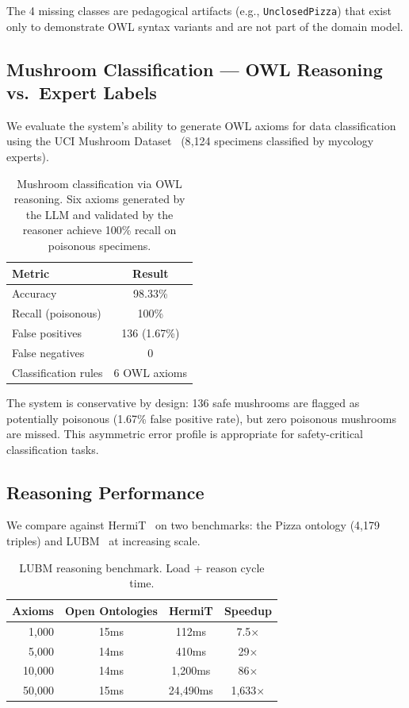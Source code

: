 \documentclass[runningheads]{llncs}
\begin{document}
The 4 missing classes are pedagogical artifacts (e.g., \texttt{UnclosedPizza}) that exist only to demonstrate OWL syntax variants and are not part of the domain model.

\subsection{Mushroom Classification — OWL Reasoning vs.\ Expert Labels}

We evaluate the system's ability to generate OWL axioms for data classification using the UCI Mushroom Dataset~\cite{mushroom} (8{,}124 specimens classified by mycology experts).

\begin{table}[t]
\centering
\caption{Mushroom classification via OWL reasoning. Six axioms generated by the LLM and validated by the reasoner achieve 100\% recall on poisonous specimens.}
\label{tab:mushroom}
\begin{tabular}{@{}lc@{}}
\toprule
\textbf{Metric} & \textbf{Result} \\
\midrule
Accuracy & 98.33\% \\
Recall (poisonous) & 100\% \\
False positives & 136 (1.67\%) \\
False negatives & 0 \\
Classification rules & 6 OWL axioms \\
\bottomrule
\end{tabular}
\end{table}

The system is conservative by design: 136 safe mushrooms are flagged as potentially poisonous (1.67\% false positive rate), but zero poisonous mushrooms are missed. This asymmetric error profile is appropriate for safety-critical classification tasks.

\subsection{Reasoning Performance}

We compare against HermiT~\cite{hermit} on two benchmarks: the Pizza ontology (4{,}179 triples) and LUBM~\cite{lubm} at increasing scale.

\begin{table}[t]
\centering
\caption{LUBM reasoning benchmark. Load + reason cycle time.}
\label{tab:lubm}
\begin{tabular}{@{}rccc@{}}
\toprule
\textbf{Axioms} & \textbf{Open Ontologies} & \textbf{HermiT} & \textbf{Speedup} \\
\midrule
1{,}000 & 15ms & 112ms & 7.5$\times$ \\
5{,}000 & 14ms & 410ms & 29$\times$ \\
10{,}000 & 14ms & 1{,}200ms & 86$\times$ \\
50{,}000 & 15ms & 24{,}490ms & 1{,}633$\times$ \\
\bottomrule
\end{tabular}
\end{table}
\end{document}
